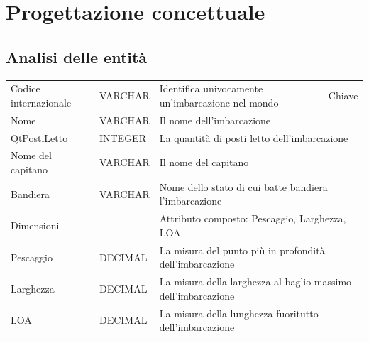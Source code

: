 \section{Progettazione concettuale}

\subsection{Analisi delle entità}

\begin{center}
    \begin{tabularx}{\textwidth}{|l|l|l|X|}
        \hline
        \rowcolor{gray!30}
        \multicolumn{4}{|c|}{\textbf{Imbarcazione}}\\
        \hline
        Codice internazionale & VARCHAR & Identifica univocamente un'imbarcazione nel mondo & Chiave\\
        \hline
        Nome & VARCHAR & \multicolumn{2}{l|}{Il nome dell'imbarcazione} \\
        \hline
        QtPostiLetto & INTEGER & \multicolumn{2}{l|}{La quantità di posti letto dell'imbarcazione} \\
        \hline
        Nome del capitano & VARCHAR & \multicolumn{2}{l|}{Il nome del capitano} \\
        \hline
        Bandiera & VARCHAR & \multicolumn{2}{l|}{Nome dello stato di cui batte bandiera l'imbarcazione} \\
        \hline
        Dimensioni &  & \multicolumn{2}{l|}{Attributo composto: Pescaggio, Larghezza, LOA} \\
        \hline
        Pescaggio & DECIMAL & \multicolumn{2}{l|}{La misura del punto più in profondità dell'imbarcazione} \\
        \hline
        Larghezza & DECIMAL & \multicolumn{2}{l|}{La misura della larghezza al baglio massimo dell'imbarcazione} \\
        \hline
        LOA & DECIMAL & \multicolumn{2}{l|}{La misura della lunghezza fuoritutto dell'imbarcazione} \\
        \hline
    \end{tabularx}
\end{center}


